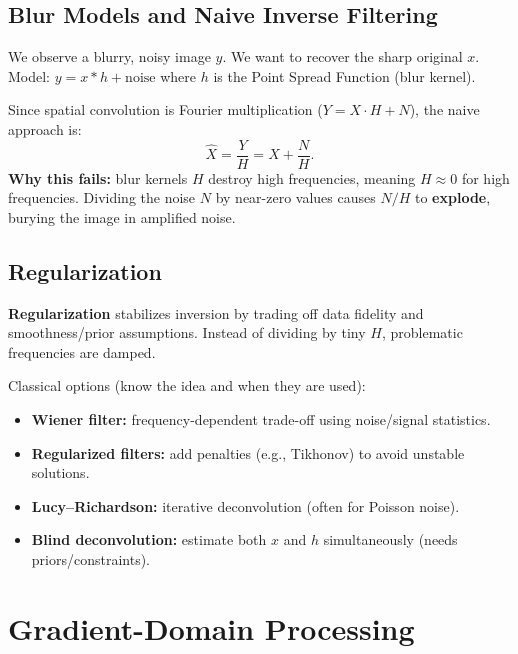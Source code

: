 \documentclass[11pt, oneside]{book}
\begin{document}
\begin{thmbox}[title={Reprojection Error Minimization}]
\begin{defbox}[title={Correlation and Convolution}]
\subsection{Blur Models and Naive Inverse Filtering}

\begin{defbox}[title={Image Degradation Model}]
We observe a blurry, noisy image $y$. We want to recover the sharp original $x$.
Model: $y = x*h + \text{noise}$ where $h$ is the Point Spread Function (blur kernel).
\end{defbox}

\begin{thmbox}[title={Naive Inverse Filtering}]
Since spatial convolution is Fourier multiplication ($Y = X \cdot H + N$), the naive approach is:
\[
\hat{X} = \frac{Y}{H} = X + \frac{N}{H}.
\]
\textbf{Why this fails:} blur kernels $H$ destroy high frequencies, meaning $H \approx 0$ for high frequencies.
Dividing the noise $N$ by near-zero values causes $N/H$ to \textbf{explode}, burying the image in amplified noise.
\end{thmbox}

\subsection{Regularization}

\begin{intbox}
\textbf{Regularization} stabilizes inversion by trading off data fidelity and smoothness/prior assumptions.
Instead of dividing by tiny $H$, problematic frequencies are damped.
\end{intbox}

Classical options (know the idea and when they are used):
\begin{itemize}
  \item \textbf{Wiener filter:} frequency-dependent trade-off using noise/signal statistics.
  \item \textbf{Regularized filters:} add penalties (e.g., Tikhonov) to avoid unstable solutions.
  \item \textbf{Lucy--Richardson:} iterative deconvolution (often for Poisson noise).
  \item \textbf{Blind deconvolution:} estimate both $x$ and $h$ simultaneously (needs priors/constraints).
\end{itemize}

\section{Gradient-Domain Processing}


\end{defbox}
\end{thmbox}
\end{document}

